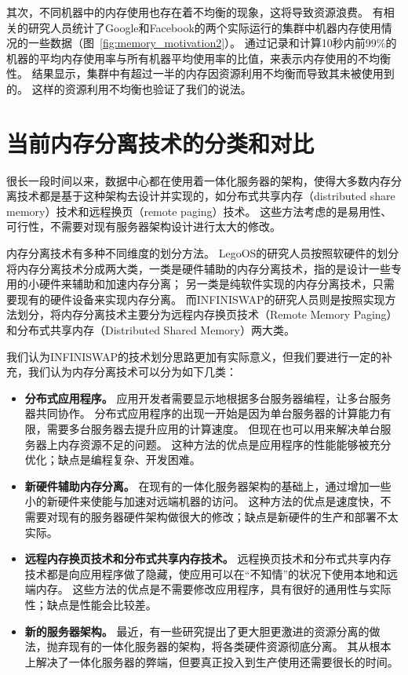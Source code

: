 其次，不同机器中的内存使用也存在着不均衡的现象，这将导致资源浪费。
有相关的研究人员统计了Google和Facebook的两个实际运行的集群中机器内存使用情况的一些数据（图~\ref{fig:memory_motivation2}）。
通过记录和计算10秒内前99\%的机器的平均内存使用率与所有机器平均使用率的比值，来表示内存使用的不均衡性。
结果显示，集群中有超过一半的内存因资源利用不均衡而导致其未被使用到的。
这样的资源利用不均衡也验证了我们的说法。



\section{当前内存分离技术的分类和对比}

很长一段时间以来，数据中心都在使用着一体化服务器的架构，使得大多数内存分离技术都是基于这种架构去设计并实现的，如分布式共享内存（distributed share memory）技术和远程换页（remote paging）技术。
这些方法考虑的是易用性、可行性，不需要对现有服务器架构设计进行太大的修改。

内存分离技术有多种不同维度的划分方法。
LegoOS的研究人员按照软硬件的划分将内存分离技术分成两大类，一类是硬件辅助的内存分离技术，指的是设计一些专用的小硬件来辅助和加速内存分离；
另一类是纯软件实现的内存分离技术，只需要现有的硬件设备来实现内存分离。
而INFINISWAP的研究人员则是按照实现方法划分，将内存分离技术主要分为远程内存换页技术（Remote Memory Paging）和分布式共享内存（Distributed Shared Memory）两大类。

我们认为INFINISWAP的技术划分思路更加有实际意义，但我们要进行一定的补充，我们认为内存分离技术可以分为如下几类：

\begin{itemize}
\item \textbf{分布式应用程序。}
应用开发者需要显示地根据多台服务器编程，让多台服务器共同协作。
分布式应用程序的出现一开始是因为单台服务器的计算能力有限，需要多台服务器去提升应用的计算速度。
但现在也可以用来解决单台服务器上内存资源不足的问题。
这种方法的优点是应用程序的性能能够被充分优化；缺点是编程复杂、开发困难。

\item \textbf{新硬件辅助内存分离。}
在现有的一体化服务器架构的基础上，通过增加一些小的新硬件来使能与加速对远端机器的访问。
这种方法的优点是速度快，不需要对现有的服务器硬件架构做很大的修改；缺点是新硬件的生产和部署不太实际。

\item \textbf{远程内存换页技术和分布式共享内存技术。}
远程换页技术和分布式共享内存技术都是向应用程序做了隐藏，使应用可以在“不知情”的状况下使用本地和远端内存。
这些方法的优点是不需要修改应用程序，具有很好的通用性与实际性；缺点是性能会比较差。

\item \textbf{新的服务器架构。}
最近，有一些研究提出了更大胆更激进的资源分离的做法，抛弃现有的一体化服务器的架构，将各类硬件资源彻底分离。
其从根本上解决了一体化服务器的弊端，但要真正投入到生产使用还需要很长的时间。

\end{itemize}


